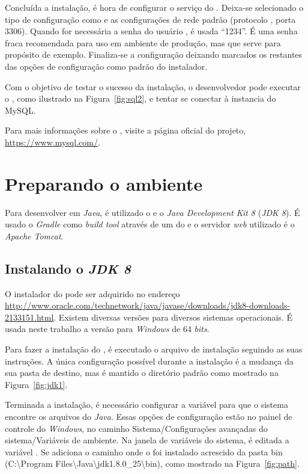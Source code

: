 Concluída a instalação, é hora de configurar o serviço do . Deixa-se selecionado o tipo de configuração como  e as configurações de rede padrão (protocolo , porta 3306). Quando for necessária a senha do usuário , é usada “1234”. É uma senha fraca recomendada para uso em ambiente de produção, mas que serve para propósito de exemplo. Finaliza-se a configuração deixando marcados os restantes das opções de configuração como padrão do instalador.

Com o objetivo de testar o sucesso da instalação, o desenvolvedor pode executar o , como ilustrado na Figura~\ref{fig:sql2}, e tentar se conectar à instancia do MySQL.


Para mais informações sobre o , visite a página oficial do projeto, \url{https://www.mysql.com/}.

\section{Preparando o ambiente }

Para desenvolver em \textit{Java}, é utilizado o  e o \textit{Java Development Kit 8} (\textit{JDK 8}). É usado o \textit{Gradle} como \textit{build tool} através de um  do  e o servidor \textit{web} utilizado é o \textit{Apache Tomcat}.

\subsection{Instalando o \textit{JDK 8}}

O instalador do  pode ser adquirido no endereço \url{http://www.oracle.com/technetwork/java/javase/downloads/jdk8-downloads-2133151.html}. Existem diversas versões para diversos sistemas operacionais. É usada neste trabalho a versão para \textit{Windows} de 64 \textit{bits}. 

Para fazer a instalação do , é executado o arquivo de instalação seguindo as suas instruções. A única configuração possível durante a instalação é a mudança da sua pasta de destino, mas é mantido o diretório padrão como mostrado na Figura~\ref{fig:jdk1}.


Terminada a instalação, é necessário configurar a variável  para que o sistema encontre os arquivos do \textit{Java}. Essas opções de configuração estão no painel de controle do \textit{Windows}, no caminho Sistema/Configurações avançadas do sistema/Variáveis de ambiente. Na janela de variáveis do sistema, é editada a variável . Se adiciona o caminho onde o  foi instalado acrescido da pasta bin (C:\textbackslash Program Files\textbackslash Java\textbackslash jdk\textmd{1.8.0\_25}\textbackslash bin), como mostrado na Figura~\ref{fig:path}.


